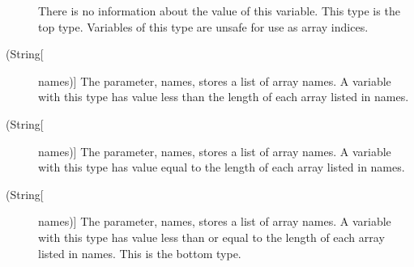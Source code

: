\begin{description}
\item[]
  There is no information about the value of this variable.
  This type is the top type. Variables of this type are
  unsafe for use as array indices.
\item[(String[] names)]
  The parameter, names, stores a list of array names. A variable with this type
  has value less than the length of each array listed in names.
\item[(String[] names)]
  The parameter, names, stores a list of array names. A variable with this type
  has value equal to the length of each array listed in names.
\item[(String[] names)]
  The parameter, names, stores a list of array names. A variable with this type
  has value less than or equal to the length of each array listed in names.
  This is the bottom type.
\end{description}
